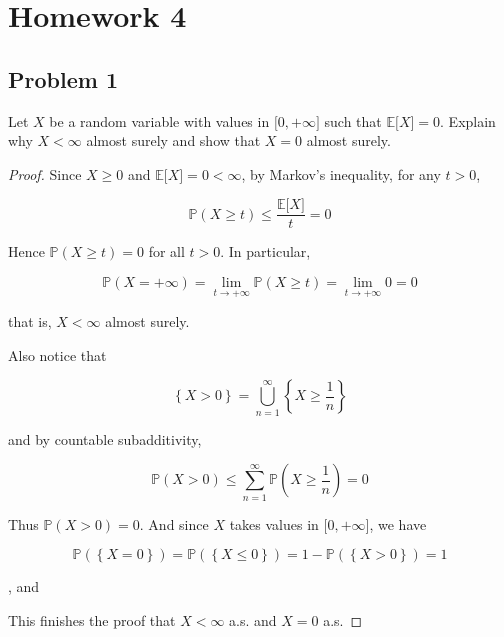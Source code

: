 \chapter{Homework 4}\label{homework-4}

\section{Problem 1}\label{hw04-problem-1}

Let \(\mathit{X}\) be a random variable with values in \(\lbrack 0, + \infty\rbrack\) such that \(\mathbb{E}\lbrack\mathit{X}\rbrack = 0\). Explain why \(\mathit{X} < \infty\) almost surely and show that \(\mathit{X} = 0\) almost surely.

\begin{proof}

Since \(\mathit{X} \geq 0\) and \(\mathbb{E}\lbrack\mathit{X}\rbrack = 0 < \infty\), by Markov's inequality, for any \(\mathit{t} > 0\),

\[\mathbb{P}(\mathit{X} \geq \mathit{t}) \leq \frac{\mathbb{E}\lbrack\mathit{X}\rbrack}{\mathit{t}} = 0\]

Hence \(\mathbb{P}(\mathit{X} \geq \mathit{t}) = 0\) for all \(\mathit{t} > 0\). In particular,

\[\mathbb{P}(\mathit{X} = + \infty) = \lim\limits_{\mathit{t}\rightarrow + \infty}\mathbb{P}(\mathit{X} \geq \mathit{t}) = \lim\limits_{\mathit{t}\rightarrow + \infty}0 = 0\]

that is, \(\mathit{X} < \infty\) almost surely.

Also notice that

\[\left\{ {\mathit{X} > 0} \right\} = \bigcup\limits_{\mathit{n} = 1}^{\infty}\left\{ {\mathit{X} \geq \frac{1}{\mathit{n}}} \right\}\]

and by countable subadditivity,

\[\mathbb{P}(\mathit{X} > 0) \leq \sum\limits_{\mathit{n} = 1}^{\infty}\mathbb{P}\left( {\mathit{X} \geq \frac{1}{\mathit{n}}} \right) = 0\]

Thus \(\mathbb{P}(\mathit{X} > 0) = 0\). And since \(\mathit{X}\) takes values in \(\lbrack 0, + \infty\rbrack\), we have

\[\mathbb{P}(\left\{ {\mathit{X} = 0} \right\}) = \mathbb{P}(\left\{ {\mathit{X} \leq 0} \right\}) = 1 - \mathbb{P}(\left\{ {\mathit{X} > 0} \right\}) = 1\]

, and

This finishes the proof that \(\mathit{X} < \infty\) a.s. and \(\mathit{X} = 0\) a.s.

\end{proof}

